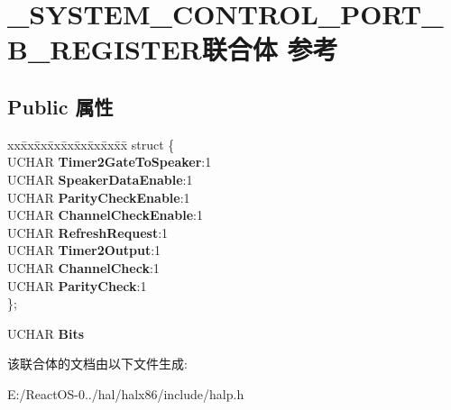 \hypertarget{union___s_y_s_t_e_m___c_o_n_t_r_o_l___p_o_r_t___b___r_e_g_i_s_t_e_r}{}\section{\+\_\+\+S\+Y\+S\+T\+E\+M\+\_\+\+C\+O\+N\+T\+R\+O\+L\+\_\+\+P\+O\+R\+T\+\_\+\+B\+\_\+\+R\+E\+G\+I\+S\+T\+E\+R联合体 参考}
\label{union___s_y_s_t_e_m___c_o_n_t_r_o_l___p_o_r_t___b___r_e_g_i_s_t_e_r}
\subsection*{Public 属性}
\begin{DoxyCompactItemize}
\item 
\mbox{\label{union___s_y_s_t_e_m___c_o_n_t_r_o_l___p_o_r_t___b___r_e_g_i_s_t_e_r_aaf400436131d3beee16b0bc928e7564b}} 
\begin{tabbing}
xx\=xx\=xx\=xx\=xx\=xx\=xx\=xx\=xx\=\kill
struct \{\\
\>UCHAR {\bfseries Timer2GateToSpeaker}:1\\
\>UCHAR {\bfseries SpeakerDataEnable}:1\\
\>UCHAR {\bfseries ParityCheckEnable}:1\\
\>UCHAR {\bfseries ChannelCheckEnable}:1\\
\>UCHAR {\bfseries RefreshRequest}:1\\
\>UCHAR {\bfseries Timer2Output}:1\\
\>UCHAR {\bfseries ChannelCheck}:1\\
\>UCHAR {\bfseries ParityCheck}:1\\
\}; \\

\end{tabbing}\item 
\mbox{\label{union___s_y_s_t_e_m___c_o_n_t_r_o_l___p_o_r_t___b___r_e_g_i_s_t_e_r_af2d90c167fdadb4ff304ff81a9dd900a}} 
U\+C\+H\+AR {\bfseries Bits}
\end{DoxyCompactItemize}


该联合体的文档由以下文件生成\+:\begin{DoxyCompactItemize}
\item 
E\+:/\+React\+O\+S-\/0../hal/halx86/include/halp.\+h\end{DoxyCompactItemize}
